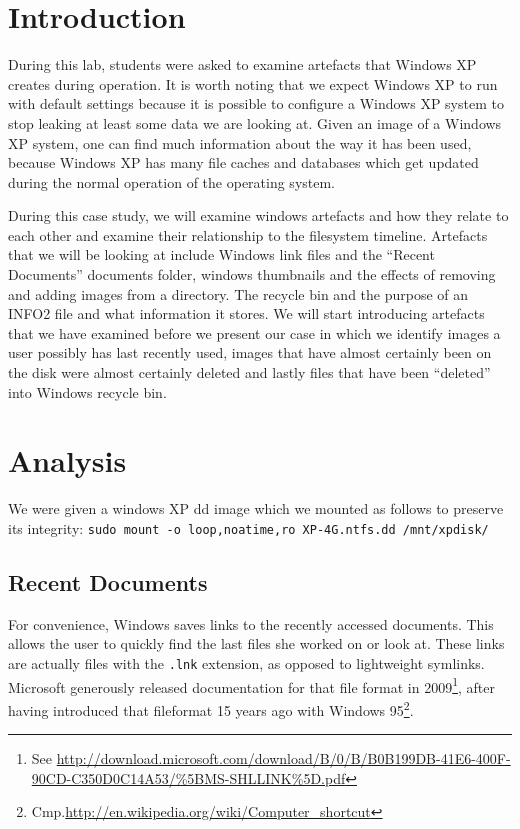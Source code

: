\documentclass[a4paper,
    11pt,
    normalheadings,
    parindent,
    UKenglish,
    abstracton,
    ]{scrartcl}
\title{\mytitle{}}
\author{
    cand. Dipl. Inf. Tobias Müller <\href{mailto:muellet2@computing.dcu.ie?subject=ss10-forensic-lab01}{muellet2@}>, 59212333 \and
    BSc. Anthony Walters <\href{mailto:waltersa3@computing.dcu.ie?subject=ss10-forensic-lab01}{waltersa3@}>, 59213102
    }
\date{\today}
\begin{document}
\maketitle


\section{Introduction}
During this lab, students were asked to examine artefacts that Windows XP creates during operation.
It is worth noting that we expect Windows XP to run with default settings because it is possible to configure a Windows XP system to stop leaking at least some data we are looking at.
Given an image of a Windows XP system, one can find much information about the way it has been used, because Windows XP has many file caches and databases which get updated during the normal operation of the operating system.

During this case study, we will examine windows artefacts and how they relate to each other and examine their relationship to the filesystem timeline. Artefacts that we will be looking at include Windows link files and the ``Recent Documents'' documents folder, windows thumbnails and the effects of removing and adding images from a directory. The recycle bin  and the  purpose of an INFO2 file and what information it stores. We will start introducing  artefacts that we have examined before we present our case in which we identify
images a user possibly has last recently used, images that have almost certainly been on the disk were almost certainly deleted
and lastly files that have been ``deleted'' into Windows recycle bin.



\section{Analysis}

We were given a windows XP dd image which we mounted as follows to preserve its integrity: \verb|sudo mount -o loop,noatime,ro XP-4G.ntfs.dd /mnt/xpdisk/|


\subsection{Recent Documents}
For convenience, Windows saves links to the recently accessed documents.
This allows the user to quickly find the last files she worked on or look at.
These links are actually files with the \texttt{.lnk} extension, as opposed to lightweight symlinks.
Microsoft generously released documentation for that file format in 2009\footnote{See \url{http://download.microsoft.com/download/B/0/B/B0B199DB-41E6-400F-90CD-C350D0C14A53/\%5BMS-SHLLINK\%5D.pdf}},
after having introduced that fileformat 15 years ago with Windows 95\footnote{Cmp.\url{http://en.wikipedia.org/wiki/Computer_shortcut}}.
\end{document}
